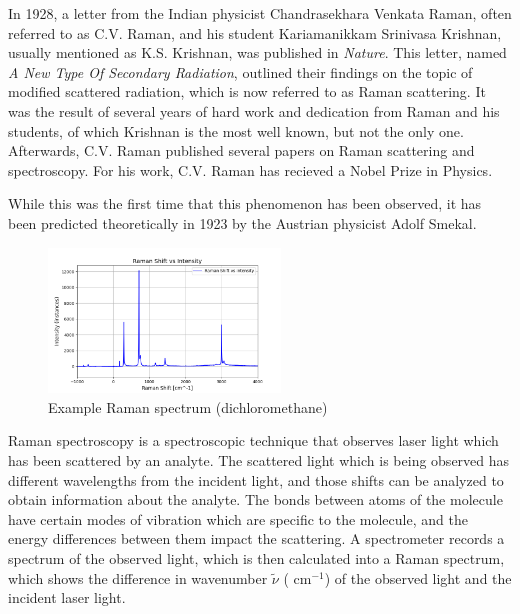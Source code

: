 In 1928, a letter from the Indian physicist Chandrasekhara Venkata Raman, often referred to as C.V. Raman, and his student Kariamanikkam Srinivasa Krishnan, usually mentioned as K.S. Krishnan, was published in \textit{Nature}. This letter, named \textit{A New Type Of Secondary Radiation}, outlined their findings on the topic of modified scattered radiation, which is now referred to as Raman scattering. It was the result of several years of hard work and dedication from Raman and his students, of which Krishnan is the most well known, but not the only one. Afterwards, C.V. Raman published several papers on Raman scattering and spectroscopy. For his work, C.V. Raman has recieved a Nobel Prize in Physics. \cite{ram28}
\bigskip

While this was the first time that this phenomenon has been observed, it has been predicted theoretically in 1923 by the Austrian physicist Adolf Smekal. 
\bigskip

\begin{figure} %
    \centering
    \vspace{-25pt}
    \includegraphics[width=0.55\textwidth]{images/raman_spectra/raman_shift_DCM.png}
    \caption{Example Raman spectrum (dichloromethane)}
    \label{fig:ex_dcm}
    \vspace{-15pt}
\end{figure}


Raman spectroscopy is a spectroscopic technique that observes laser light which has been scattered by an analyte. The scattered light which is being observed has different wavelengths from the incident light, and those shifts can be analyzed to obtain information about the analyte. The bonds between atoms of the molecule have certain modes of vibration which are specific to the molecule, and the energy differences between them impact the scattering. A spectrometer records a spectrum of the observed light, which is then calculated into a Raman spectrum, which shows the difference in wavenumber \( \widetilde{\nu}\) ( cm\(^{-1}\)) of the observed light and the incident laser light.



